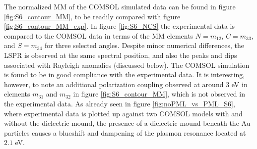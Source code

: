 The normalized MM of the COMSOL simulated data can be found in figure \ref{fig:S6_contour_MM}, to be readily compared with figure \ref{fig:S6_contour_MM_exp}. In figure \ref{fig:S6_NCS} the experimental data is compared to the COMSOL data in terms of the MM elements $N=m_{12}$, $C=m_{33}$, and $S=m_{34}$ for three selected angles. Despite minor numerical differences, the LSPR is observed at the same spectral position, and also the peaks and dips associated with Rayleigh anomalies (discussed below). The COMSOL simulation is found to be in good compliance with the experimental data. It is interesting, however, to note an additional polarization coupling observed at around $3$ eV in elements $m_{31}$ and $m_{32}$ in figure \ref{fig:S6_contour_MM}, which is not observed in the experimental data. As already seen in figure \ref{fig:noPML_vs_PML_S6}, where experimental data is plotted up against two COMSOL models with and without the dielectric mound, the presence of a dielectric mound beneath the Au particles causes a blueshift and dampening of the plasmon resonance located at $2.1$ eV. 
